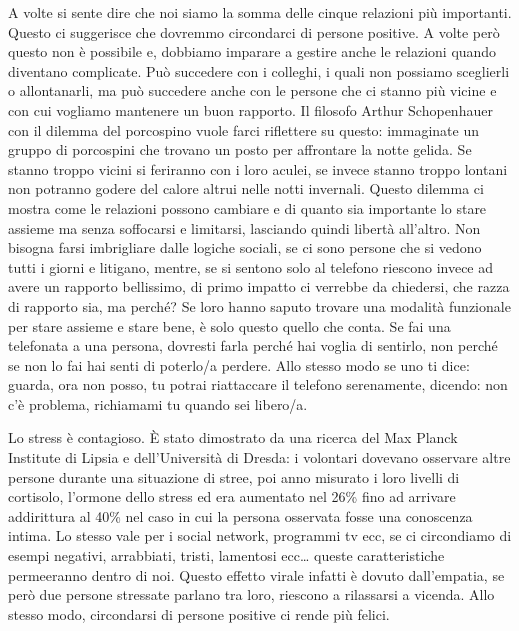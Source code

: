 \documentclass[12pt]{book} %
\begin{document}
\bigskip

A volte si sente dire che noi siamo la somma delle cinque relazioni più importanti. Questo ci suggerisce che dovremmo
circondarci di persone positive. A volte però questo non è possibile e, dobbiamo imparare a gestire anche le relazioni
quando diventano complicate. Può succedere con i colleghi, i quali non possiamo sceglierli o allontanarli, ma può
succedere anche con le persone che ci stanno più vicine e con cui vogliamo mantenere un buon rapporto. Il filosofo
Arthur Schopenhauer con il dilemma del porcospino vuole farci riflettere su questo: immaginate un gruppo di porcospini
che trovano un posto per affrontare la notte gelida. Se stanno troppo vicini si feriranno con i loro aculei, se invece
stanno troppo lontani non potranno godere del calore altrui nelle notti invernali. Questo dilemma ci mostra come le
relazioni possono cambiare e di quanto sia importante lo stare assieme ma senza soffocarsi e limitarsi, lasciando
quindi libertà all'altro. Non bisogna farsi imbrigliare dalle logiche sociali, se ci sono persone
che si vedono tutti i giorni e litigano, mentre, se si sentono solo al telefono riescono invece ad avere un rapporto
bellissimo, di primo impatto ci verrebbe da chiedersi, che razza di rapporto sia, ma perché? Se loro hanno saputo
trovare una modalità funzionale per stare assieme e stare bene, è solo questo quello che conta. Se fai una telefonata a
una persona, dovresti farla perché hai voglia di sentirlo, non perché se non lo fai hai senti di poterlo/a perdere.
Allo stesso modo se uno ti dice: guarda, ora non posso, tu potrai riattaccare il telefono serenamente, dicendo: non c'è
problema, richiamami tu quando sei libero/a.


\bigskip

Lo stress è contagioso. È stato dimostrato da una ricerca del Max Planck Institute di Lipsia e dell'Università di
Dresda: i volontari dovevano osservare altre persone durante una situazione di stree, poi anno misurato i loro livelli
di cortisolo, l'ormone dello stress ed era aumentato nel 26\% fino ad arrivare addirittura al 40\% nel caso in cui la
persona osservata fosse una conoscenza intima. Lo stesso vale per i social network, programmi tv ecc, se ci circondiamo
di esempi negativi, arrabbiati, tristi, lamentosi ecc… queste caratteristiche permeeranno dentro di noi. Questo effetto
{\textquotedbl}virale{\textquotedbl} infatti è dovuto dall'empatia, se però due persone stressate parlano tra loro,
riescono a rilassarsi a vicenda. Allo stesso modo, circondarsi di persone positive ci rende più felici. 
\end{document}

